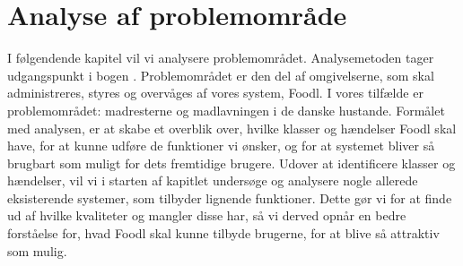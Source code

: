 \chapter{Analyse af problemområde}
\label{chap:analyseafpo}

I følgendende kapitel vil vi analysere problemområdet. Analysemetoden tager udgangspunkt i bogen \cite[s. ~43]{ooad}. Problemområdet er den del af omgivelserne, som skal administreres, styres og overvåges af vores system, Foodl. I vores tilfælde er problemområdet: madresterne og madlavningen i de danske hustande. Formålet med analysen, er at skabe et overblik over, hvilke klasser og hændelser Foodl skal have, for at kunne udføre de funktioner vi ønsker, og for at systemet bliver så brugbart som muligt for dets fremtidige brugere. Udover at identificere klasser og hændelser, vil vi i starten af kapitlet undersøge og analysere nogle allerede eksisterende systemer, som tilbyder lignende funktioner. Dette gør vi for at finde ud af hvilke kvaliteter og mangler disse har, så vi derved opnår en bedre forståelse for, hvad Foodl skal kunne tilbyde brugerne, for at blive så attraktiv som mulig.



 

